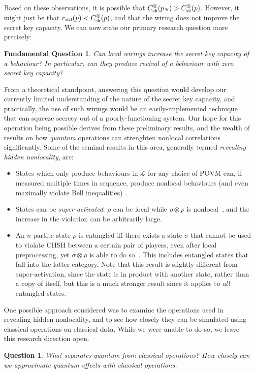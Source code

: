 \documentclass[10pt, a4paper]{article}
\numberwithin{equation}{section} %
\theoremstyle{definition}
\theoremstyle{plain}
\newtheorem{question}{Question}
\newtheorem{funqn}{Fundamental Question}
\newcommand{\?}{\mathrel{?}} %
\newcommand{\Ls}{\mathcal{L}}
\newcommand{\sk}{\rm sk}
\newcommand{\std}{\rm std}
\begin{document}
              Based on these observations, it is possible that \(C^{\otimes}_{\sk}(p_N) > C^{\otimes}_{\sk}(p)\). However, it might just be that \(r_{\std}(p) < C^{\otimes}_{\sk}(p)\), and that the wiring does not improve the secret key capacity. We can now state our primary research question more precisely:
              \begin{funqn}\label{fqn:wircap}
                Can local wirings increase the secret key capacity of a behaviour? In particular, can they produce revival of a behaviour with zero secret key capacity?
              \end{funqn}

              From a theoretical standpoint, answering this question would develop our currently limited understanding of the nature of the secret key capacity, and practically, the use of such wirings would be an easily-implemented technique that can squeeze secrecy out of a poorly-functioning system. Our hope for this operation being possible derives from these preliminary results, and the wealth of results on how \emph{quantum} operations can strenghten nonlocal correlations significantly. Some of the seminal results in this area, generally termed \emph{revealing hidden nonlocality}, are:
              \begin{itemize}
                \item States which only produce behaviours in \(\Ls\) for any choice of POVM can, if measured multiple times in sequence, produce nonlocal behaviours (and even maximally violate Bell inequalities)~\cite{HiddenNLAllMeas}.
                \item States can be \emph{super-activated}: \(\rho\) can be local while \(\rho \otimes \rho\) is nonlocal~\cite{SuperActivationBipartite}, and the increase in the violation can be arbitrarily large.
                \item An \(n\)-partite state \(\rho\) is entangled iff there exists a state \(\sigma\) that cannot be used to violate CHSH between a certain pair of players, even after local preprocessing, yet \(\sigma \otimes \rho\) is able to do so~\cite{AllEntangHidden}. This includes entangled states that fall into the latter category. Note that this result is slightly different from super-activation, since the state is in product with another state, rather than a copy of itself, but this is a much stronger result since it applies to \emph{all} entangled states.
              \end{itemize}

              One possible approach considered was to examine the operations used in revealing hidden nonlocality, and to see how closely they can be simulated using classical operations on classical data. While we were unable to do so, we leave this research direction open.
              \begin{question}
                What separates quantum from classical operations? How closely can we approximate quantum effects with classical operations.
              \end{question}
\end{document}

